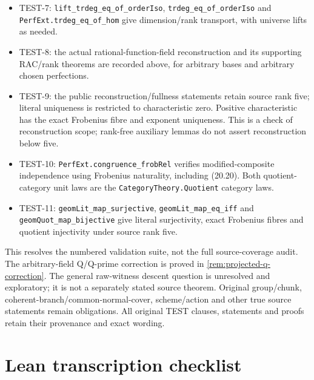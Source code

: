 \documentclass[11pt,oneside]{article}
\theoremstyle{definition}
\theoremstyle{remark}
\newcommand{\lean}[1]{\nolinkurl{#1}}
\begin{document}
\begin{itemize}
claim in characteristic two; the corrected replacement covers every source characteristic.
\item TEST-7: \lean{lift_trdeg_eq_of_orderIso}, \lean{trdeg_eq_of_orderIso} and
\lean{PerfExt.trdeg_eq_of_hom} give dimension/rank transport, with universe lifts as needed.
\item TEST-8: the actual rational-function-field reconstruction and its supporting RAC/rank
theorems are recorded above, for arbitrary bases and arbitrary chosen perfections.
\item TEST-9: the public reconstruction/fullness statements retain source rank five;
literal uniqueness is restricted to characteristic zero. Positive characteristic has
the exact Frobenius fibre and exponent uniqueness. This is a check of reconstruction
scope; rank-free auxiliary lemmas do not assert reconstruction below five.
\item TEST-10: \lean{PerfExt.congruence_frobRel} verifies modified-composite independence
using Frobenius naturality, including (20.20). Both quotient-category unit laws are the
\lean{CategoryTheory.Quotient} category laws.
\item TEST-11: \lean{geomLit_map_surjective}, \lean{geomLit_map_eq_iff} and
\lean{geomQuot_map_bijective} give literal surjectivity, exact Frobenius fibres and
quotient injectivity under source rank five.
\end{itemize}
This resolves the numbered validation suite, not the full source-coverage audit. The
arbitrary-field Q/Q-prime correction is proved in \cref{rem:projected-q-correction}.
The general raw-witness descent question is unresolved and exploratory; it is not a
separately stated source theorem.
Original group/chunk, coherent-branch/common-normal-cover, scheme/action and other true
source statements remain obligations. All original TEST clauses, statements and proofs
retain their provenance and exact wording.

\section{Lean transcription checklist}
\end{document}
